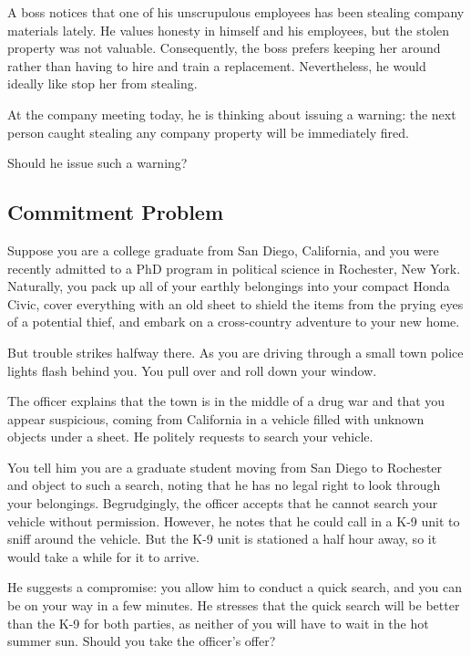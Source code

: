\documentclass[11pt,]{article}
\begin{document}
A boss notices that one of his unscrupulous employees has been stealing
company materials lately. He values honesty in himself and his
employees, but the stolen property was not valuable. Consequently, the
boss prefers keeping her around rather than having to hire and train a
replacement. Nevertheless, he would ideally like stop her from stealing.

At the company meeting today, he is thinking about issuing a warning:
the next person caught stealing any company property will be immediately
fired.

Should he issue such a warning?

\newpage

\hypertarget{commitment-problem}{%
\subsection{Commitment Problem}\label{commitment-problem}}

Suppose you are a college graduate from San Diego, California, and you
were recently admitted to a PhD program in political science in
Rochester, New York. Naturally, you pack up all of your earthly
belongings into your compact Honda Civic, cover everything with an old
sheet to shield the items from the prying eyes of a potential thief, and
embark on a cross-country adventure to your new home.

But trouble strikes halfway there. As you are driving through a small
town police lights flash behind you. You pull over and roll down your
window.

The officer explains that the town is in the middle of a drug war and
that you appear suspicious, coming from California in a vehicle filled
with unknown objects under a sheet. He politely requests to search your
vehicle.

You tell him you are a graduate student moving from San Diego to
Rochester and object to such a search, noting that he has no legal right
to look through your belongings. Begrudgingly, the officer accepts that
he cannot search your vehicle without permission. However, he notes that
he could call in a K-9 unit to sniff around the vehicle. But the K-9
unit is stationed a half hour away, so it would take a while for it to
arrive.

He suggests a compromise: you allow him to conduct a quick search, and
you can be on your way in a few minutes. He stresses that the quick
search will be better than the K-9 for both parties, as neither of you
will have to wait in the hot summer sun. Should you take the officer's
offer?
\end{document}
